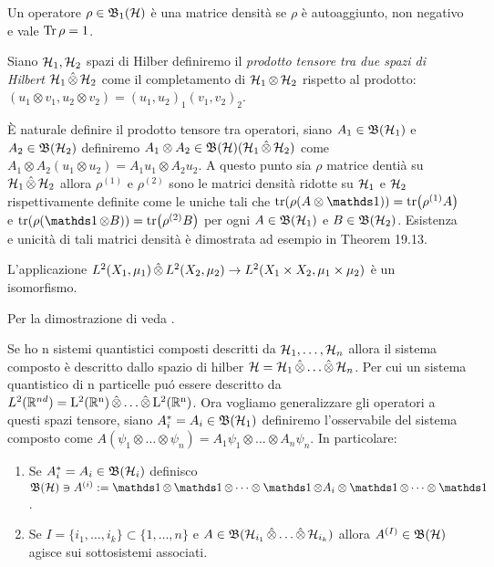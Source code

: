 \begin{definition}
    Un operatore $\rho\in \operatorname{\mathfrak{B}_1(\mathcal{H})}$ è una matrice densità se $\rho$ è autoaggiunto, non negativo e vale $\Tr \rho =1$.
\end{definition}

\begin{definition}
    Siano $\operatorname{\mathcal{H}}_1, \operatorname{\mathcal{H}}_2$ spazi di Hilber definiremo il \emph{prodotto tensore tra due spazi di Hilbert} $\operatorname{\mathcal{H}}_1 \hat{\otimes} \operatorname{\mathcal{H}}_2$ come il completamento di $\operatorname{\mathcal{H}}_1 \otimes \operatorname{\mathcal{H}}_2$ rispetto al prodotto:
$(u_1 \otimes v_1, u_2 \otimes v_2)= (u_1, u_2)_1 (v_1, v_2)_2$.
\end{definition}

È naturale definire il prodotto tensore tra operatori, siano $A_1 \in \mathfrak{B}(\operatorname{\mathcal{H}}_1)$ e $A_2 \in \mathfrak{B}(\operatorname{\mathcal{H}}_2)$ definiremo $A_1 \otimes A_2 \in \operatorname{\mathfrak{B}(\mathcal{H})}(\operatorname{\mathcal{H}}_1 \hat{\otimes} \operatorname{\mathcal{H}}_2)$ come $A_1 \otimes A_2(u_1 \otimes u_2) = A_1 u_1 \otimes A_2 u_2$.
A questo punto sia $\rho$ matrice dentià su $\operatorname{\mathcal{H}}_1 \operatorname{\hat{\otimes}} \operatorname{\mathcal{H}}_2$ allora $\rho^{(1)}$ e $\rho^{(2)}$ sono le matrici densità ridotte su $\operatorname{\mathcal{H}}_1$ e $\operatorname{\mathcal{H}}_2$ rispettivamente definite come le uniche tali che $\tr(\rho(A \otimes \un))= \tr(\rho^{(1)}A)$ e $\tr(\rho(\un \otimes B))= \tr(\rho^{(2)}B)$ per ogni $A \in \mathfrak{B}(\operatorname{\mathcal{H}}_1)$ e $B \in \mathfrak{B}(\operatorname{\mathcal{H}}_2)$. Esistenza e unicità di tali matrici densità è dimostrata ad esempio in \cite{Hall} Theorem 19.13.


\begin{proposition}
    L'applicazione $ L^2(X_1, \mu_1) \operatorname{\hat{\otimes}} L^2(X_2, \mu_2) \to L^2(X_1 \times X_2, \mu_1 \times \mu_2) $ è un isomorfismo.
\end{proposition}

Per la dimostrazione di veda \cite{Hall}.

Se ho n sistemi quantistici composti descritti da $\operatorname{\mathcal{H}}_1, \dots, \operatorname{\mathcal{H}}_n$ allora il sistema composto è descritto dallo spazio di hilber $\operatorname{\mathcal{H}} = \operatorname{\mathcal{H}}_1 \operatorname{\hat{\otimes}} \dots \operatorname{\hat{\otimes}} \operatorname{\mathcal{H}}_n$. 
Per cui un sistema quantistico di n particelle puó essere descritto da $L^2(\mathbb{R}^{nd})= \operatorname{L^2(\mathbb{R}^n)} \operatorname{\hat{\otimes}} \dots \operatorname{\hat{\otimes}} \operatorname{L^2(\mathbb{R}^n)}$. Ora vogliamo generalizzare gli operatori a questi spazi tensore, 
siano $A_i^* = A_i\in \mathfrak{B}(\operatorname{\mathcal{H}}_1)$ definiremo l'osservabile del sistema composto come $A(\psi_1 \otimes \dots \otimes \psi_n)= A_1 \psi_1 \otimes \dots \otimes A_n \psi_n$.
In particolare:
\begin{enumerate}
    \item Se $A_i^* = A_i\in \mathfrak{B}(\operatorname{\mathcal{H}}_i)$ definisco $\B \ni A^{ (i)} := \un \otimes \un \otimes \dots \otimes \un \otimes A_i \otimes \un \otimes \dots \otimes \un$.
    \item Se $I = \{ i_1, \dots , i_k \} \subset \{1, \dots , n \}$ e $A \in \mathfrak{B}(\operatorname{\mathcal{H}}_{i_1}\operatorname{\hat{\otimes}} \dots \operatorname{\hat{\otimes}} \operatorname{\mathcal{H}}_{i_k})$ allora $A^{ (I)} \in \operatorname{\mathfrak{B}(\mathcal{H})}$ agisce sui sottosistemi associati.
\end{enumerate}

